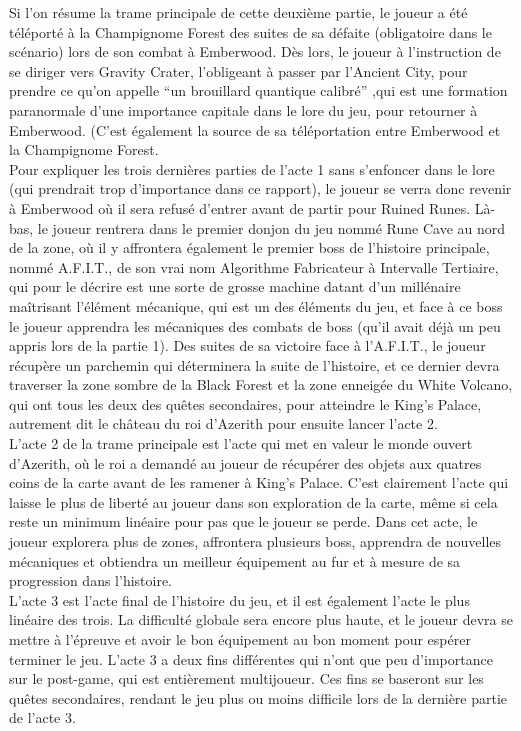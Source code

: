 Si l'on résume la trame principale de cette deuxième partie, le joueur a été téléporté à la Champignome Forest des suites de sa défaite (obligatoire dans le scénario) lors de son combat à Emberwood. Dès lors, le joueur à l'instruction de se diriger vers Gravity Crater, l'obligeant à passer par l'Ancient City, pour prendre ce qu'on appelle “un brouillard quantique calibré” ,qui est une formation paranormale d'une importance capitale dans le lore du jeu, pour retourner à Emberwood. (C'est également la source de sa téléportation entre Emberwood et la Champignome Forest.
\\

Pour expliquer les trois dernières parties de l'acte 1 sans s'enfoncer dans le lore (qui prendrait trop d'importance dans ce rapport), le joueur se verra donc revenir à Emberwood où il sera refusé d'entrer avant de partir pour Ruined Runes. Là-bas, le joueur rentrera dans le premier donjon du jeu nommé Rune Cave au nord de la zone, où il y affrontera également le premier boss de l'histoire principale, nommé A.F.I.T., de son vrai nom Algorithme Fabricateur à Intervalle Tertiaire, qui pour le décrire est une sorte de grosse machine datant d'un millénaire maîtrisant l'élément mécanique, qui est un des éléments du jeu, et face à ce boss le joueur apprendra les mécaniques des combats de boss (qu'il avait déjà un peu appris lors de la partie 1).
Des suites de sa victoire face à l'A.F.I.T., le joueur récupère un parchemin qui déterminera la suite de l'histoire, et ce dernier devra traverser la zone sombre de la Black Forest et la zone enneigée du White Volcano, qui ont tous les deux des quêtes secondaires, pour atteindre le King's Palace, autrement dit le château du roi d'Azerith pour ensuite lancer l'acte 2.
\\

L'acte 2 de la trame principale est l'acte qui met en valeur le monde ouvert d'Azerith, où le roi a demandé au joueur de récupérer des objets aux quatres coins de la carte avant de les ramener à King's Palace. C'est clairement l'acte qui laisse le plus de liberté au joueur dans son exploration de la carte, même si cela reste un minimum linéaire pour pas que le joueur se perde. Dans cet acte, le joueur explorera plus de zones, affrontera plusieurs boss, apprendra de nouvelles mécaniques et obtiendra un meilleur équipement au fur et à mesure de sa progression dans l'histoire.
\\

L'acte 3 est l'acte final de l'histoire du jeu, et il est également l'acte le plus linéaire des trois. La difficulté globale sera encore plus haute, et le joueur devra se mettre à l'épreuve et avoir le bon équipement au bon moment pour espérer terminer le jeu. L'acte 3 a deux fins différentes qui n'ont que peu d'importance sur le post-game, qui est entièrement multijoueur. Ces fins se baseront sur les quêtes secondaires, rendant le jeu plus ou moins difficile lors de la dernière partie de l'acte 3.
\\

